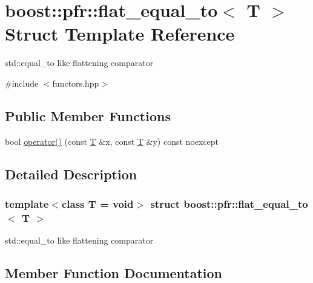 \hypertarget{structboost_1_1pfr_1_1flat__equal__to}{}\section{boost\+:\+:pfr\+:\+:flat\+\_\+equal\+\_\+to$<$ T $>$ Struct Template Reference}
\label{structboost_1_1pfr_1_1flat__equal__to}


std\+::equal\+\_\+to like flattening comparator  




{\ttfamily \#include $<$functors.\+hpp$>$}

\subsection*{Public Member Functions}
\begin{DoxyCompactItemize}
\item 
bool \mbox{\hyperlink{structboost_1_1pfr_1_1flat__equal__to_a654fc2e648b39862cd925ba686c035c6}{operator()}} (const \mbox{\hyperlink{struct_t}{T}} \&x, const \mbox{\hyperlink{struct_t}{T}} \&y) const noexcept
\end{DoxyCompactItemize}


\subsection{Detailed Description}
\subsubsection*{template$<$class T = void$>$\newline
struct boost\+::pfr\+::flat\+\_\+equal\+\_\+to$<$ T $>$}

std\+::equal\+\_\+to like flattening comparator 

\subsection{Member Function Documentation}
\mbox{\label{structboost_1_1pfr_1_1flat__equal__to_a654fc2e648b39862cd925ba686c035c6}} 
